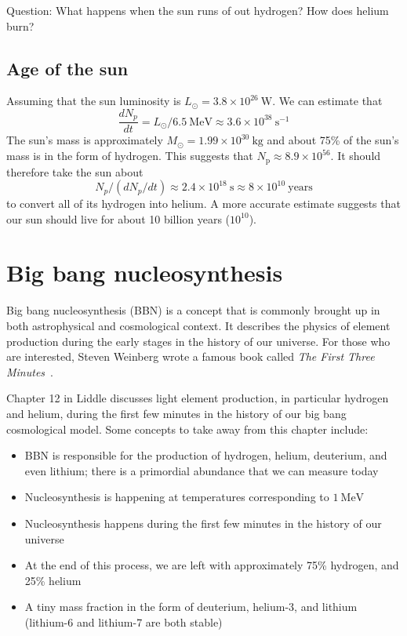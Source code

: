 \documentclass[a4paper,12pt]{article}
\theoremstyle{remark}
\newcommand{\mrm}[1]{\mathrm{#1}}
\renewcommand{\=}[1]{\stackrel{#1}{=}} %
\theoremstyle{plain}
\theoremstyle{definition}
\begin{document}
Question: What happens when the sun runs of out hydrogen? How does helium burn?

\subsection{Age of the sun}
Assuming that the sun luminosity is $L_\odot = 3.8 \times 10^{26} \:\mrm{W}$. We can estimate that 
\begin{equation}
\frac{dN_p}{dt} = L_\odot / 6.5 \:\mrm{MeV} \approx 3.6 \times 10^{38} \:\mrm{s}^{-1}
\end{equation}
The sun's mass is approximately $M _\odot = 1.99 \times 10^{30} \:\mrm{kg}$ and about 75\% of the sun's mass is in the form of hydrogen. This suggests that $N_\mrm{p} \approx 8.9 \times 10^{56}$. It should therefore take the sun about 
\begin{equation}
N_p / (dN_p / dt) \approx 2.4 \times 10^{18} \: \mrm{s} \approx 8 \times 10^{10} \:\mrm{years}
\end{equation}
to convert all of its hydrogen into helium. A more accurate estimate suggests that our sun should live for about 10 billion years ($10^{10}$).

\section{Big bang nucleosynthesis}
Big bang nucleosynthesis (BBN) is a concept that is commonly brought up in both astrophysical and cosmological context. It describes the physics of element production during the early stages in the history of our universe. For those who are interested, Steven Weinberg wrote a famous book called \textit{The First Three Minutes}~\cite{Weinberg1993}.

Chapter 12 in Liddle discusses light element production, in particular hydrogen and helium, during the first few minutes in the history of our big bang cosmological model. Some concepts to take away from this chapter include:
\begin{itemize}
\item BBN is responsible for the production of hydrogen, helium, deuterium, and even lithium; there is a primordial abundance that we can measure today
\item Nucleosynthesis is happening at temperatures corresponding to $1 \:\mrm{MeV}$
\item Nucleosynthesis happens during the first few minutes in the history of our universe
\item At the end of this process, we are left with approximately 75\% hydrogen, and 25\% helium
\item A tiny mass fraction in the form of deuterium, helium-3, and lithium (lithium-6 and lithium-7 are both stable)
\end{itemize}
\end{document}
